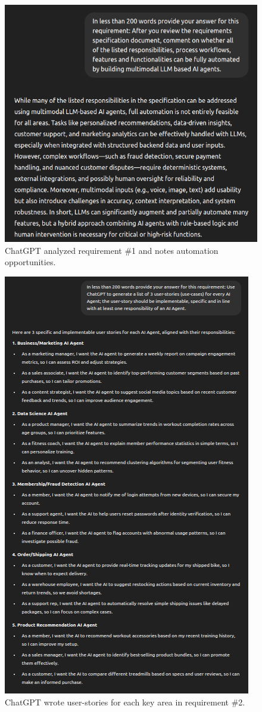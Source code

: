 \documentclass[11pt,letterpaper]{article}
\begin{document}
\begin{figure}[h!]
    \centering
      \includegraphics[width=1.0\linewidth]{chatgpt_02.png}
      \caption{ChatGPT analyzed requirement \#1 and notes automation opportunities.}
    \label{fig:req1}
\end{figure}

\begin{figure}[h!]
    \centering
      \includegraphics[width=0.75\linewidth]{chatgpt_03.png}
      \caption{ChatGPT wrote user-stories for each key area in requirement \#2.}
    \label{fig:req2}
\end{figure}
\end{document}
